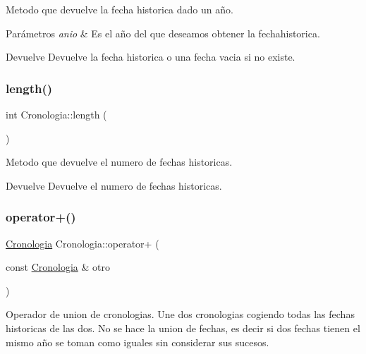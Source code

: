 Metodo que devuelve la fecha historica dado un año. 


\begin{DoxyParams}{Parámetros}
{\em anio} & Es el año del que deseamos obtener la fechahistorica. \\
\hline
\end{DoxyParams}
\begin{DoxyReturn}{Devuelve}
Devuelve la fecha historica o una fecha vacia si no existe. 
\end{DoxyReturn}
\mbox{\label{classCronologia_ab68fe5887c2d326752750f2bba998767}} 
\subsubsection{\texorpdfstring{length()}{length()}}
{\footnotesize\ttfamily int Cronologia\+::length (\begin{DoxyParamCaption}{ }\end{DoxyParamCaption})}



Metodo que devuelve el numero de fechas historicas. 

\begin{DoxyReturn}{Devuelve}
Devuelve el numero de fechas historicas. 
\end{DoxyReturn}
\mbox{\label{classCronologia_acbe7e606ace09adeb3e6469f5c8772ce}} 
\subsubsection{\texorpdfstring{operator+()}{operator+()}}
{\footnotesize\ttfamily \hyperlink{classCronologia}{Cronologia} Cronologia\+::operator+ (\begin{DoxyParamCaption}\item[{const \hyperlink{classCronologia}{Cronologia} \&}]{otro }\end{DoxyParamCaption})}



Operador de union de cronologias. Une dos cronologias cogiendo todas las fechas historicas de las dos. No se hace la union de fechas, es decir si dos fechas tienen el mismo año se toman como iguales sin considerar sus sucesos. 


